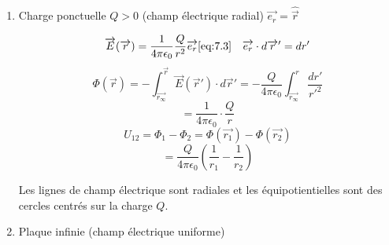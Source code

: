 \documentclass[
    11pt,
    a4paper,
    oneside,
    headinlcude, footinclude,
    twoside,
]{report}
\renewcommand{\vec}[1]{\overrightarrow{#1}}
\begin{document}
\begin{enumerate}
    \item Charge ponctuelle $Q>0$ (champ électrique radial) $\vec{e_{r}} =
        \widehat{\vec r}$

        \begin{center}
            \begin{minipage}{.5\linewidth}
                \setlength{\parskip}{.3em}
                $$ \vec E(\vec r) = \frac{1}{4 \pi \epsilon_0}\frac{Q}{r^2} \vec{e_{r}}
                \eqref{eq:7.3} \quad \vec{e_{r}} \cdot d\vec r' = dr'$$
                   $$ \Phi (\vec r) = - \int_{\vec{r_{\infty}}}^{\vec r} \vec E
                   (\vec r') \cdot d\vec r' = -\frac{Q}{4 \pi \epsilon_0}
                   \int^{r}_{\vec{r_{\infty}}} \frac{dr'}{r'^2}$$
                \begin{equation}
                    \label{eq:7.9}
                    = \frac{1}{4 \pi \epsilon_0} \cdot \frac{Q}{r}
                \end{equation}
                $$U_{12} = \Phi_1 - \Phi_2 = \Phi(\vec{r_{1}}) - \Phi(\vec{r_{2}})$$
                \begin{equation}
                    \label{eq:7.10}
                    = \frac{Q}{4 \pi \epsilon_0} \left(\frac{1}{r_1} - \frac{1}{r_2}\right)
                \end{equation}

                Les lignes de champ électrique sont radiales et les
                équipotientielles sont des cercles centrés sur la charge $Q$.
                
            \end{minipage}
            \begin{minipage}{.49\linewidth}
            \end{minipage}
        \end{center}

    \item Plaque infinie (champ électrique uniforme)


\end{enumerate}
\end{document}
